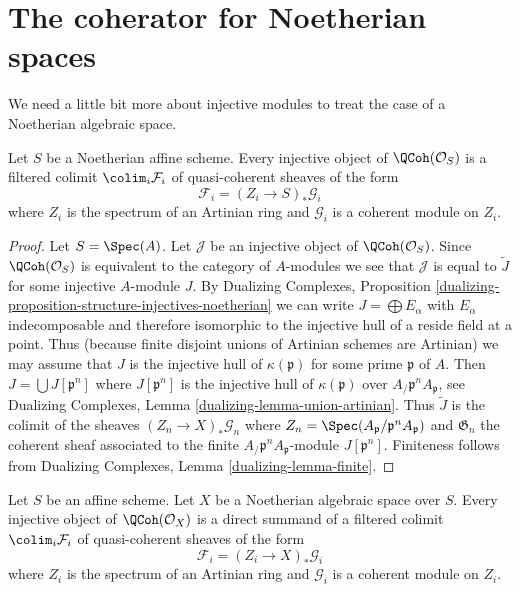 \section{The coherator for Noetherian spaces}
\label{section-coherator-Noetherian}

\noindent
We need a little bit more about injective modules to treat the case
of a Noetherian algebraic space.

\begin{lemma}
\label{lemma-affine-injective-colimit-direct-sum-pushforwards-artin}
Let $S$ be a Noetherian affine scheme. Every injective object of
$\QCoh(\mathcal{O}_S)$ is a filtered colimit $\colim_i \mathcal{F}_i$
of quasi-coherent sheaves of the form
$$
\mathcal{F}_i = (Z_i \to S)_*\mathcal{G}_i
$$
where $Z_i$ is the spectrum of an Artinian ring and $\mathcal{G}_i$
is a coherent module on $Z_i$.
\end{lemma}

\begin{proof}
Let $S = \Spec(A)$. Let $\mathcal{J}$ be an injective object of
$\QCoh(\mathcal{O}_S)$. Since $\QCoh(\mathcal{O}_S)$ is
equivalent to the category of $A$-modules we see that $\mathcal{J}$
is equal to $\widetilde{J}$ for some injective $A$-module $J$.
By Dualizing Complexes, Proposition
\ref{dualizing-proposition-structure-injectives-noetherian}
we can write $J = \bigoplus E_\alpha$ with $E_\alpha$ indecomposable
and therefore isomorphic to the injective hull of a reside field
at a point. Thus (because finite disjoint unions of Artinian schemes
are Artinian) we may assume that $J$ is the injective hull
of $\kappa(\mathfrak p)$ for some prime $\mathfrak p$ of $A$.
Then $J = \bigcup J[\mathfrak p^n]$ where $J[\mathfrak p^n]$ is
the injective hull of $\kappa(\mathfrak p)$ over
$A_\mathfrak/\mathfrak p^nA_\mathfrak p$, see
Dualizing Complexes, Lemma \ref{dualizing-lemma-union-artinian}.
Thus $\widetilde{J}$ is the colimit of the sheaves
$(Z_n \to X)_*\mathcal{G}_n$ where
$Z_n = \Spec(A_\mathfrak p/\mathfrak p^nA_\mathfrak p)$ and
$\mathfrak G_n$ the coherent sheaf associated to the
finite $A_\mathfrak/\mathfrak p^nA_\mathfrak p$-module $J[\mathfrak p^n]$.
Finiteness follows from
Dualizing Complexes, Lemma \ref{dualizing-lemma-finite}.
\end{proof}

\begin{lemma}
\label{lemma-injective-colimit-direct-sum-pushforwards-artin}
Let $S$ be an affine scheme. Let $X$ be a Noetherian algebraic space
over $S$. Every injective object of $\QCoh(\mathcal{O}_X)$ is
a direct summand of a filtered colimit $\colim_i \mathcal{F}_i$
of quasi-coherent sheaves of the form
$$
\mathcal{F}_i = (Z_i \to X)_*\mathcal{G}_i
$$
where $Z_i$ is the spectrum of an Artinian ring and $\mathcal{G}_i$
is a coherent module on $Z_i$.
\end{lemma}

